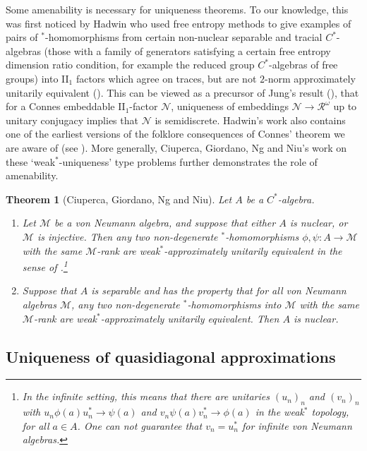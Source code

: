 \documentclass[reqno]{amsart}
\newtheorem*{theorem*}{Theorem}
\theoremstyle{definition}
\theoremstyle{remark}
\numberwithin{equation}{section}
\theoremstyle{definition}
\begin{document}
Some amenability is necessary for uniqueness theorems.  To our knowledge, this was first noticed by Hadwin who used free entropy methods to give examples of pairs of $^*$-homomorphisms from certain non-nuclear separable and tracial $C^*$-algebras (those with a family of generators satisfying a certain free entropy dimension ratio condition, for example the reduced group $C^*$-algebras of free groups) into II$_1$ factors which agree on traces, but are not $2$-norm approximately unitarily equivalent (\cite[Corollary 3.5]{Hadwin:FreeEntropy}). This can be viewed as a precursor of Jung's result (\cite{Jung:MA}), that for a Connes embeddable II$_1$-factor $\mathcal N$, uniqueness of embeddings $\mathcal N\to\mathcal R^\omega$ up to unitary conjugacy implies that $\mathcal N$ is semidiscrete. Hadwin's work also contains one of the earliest versions of the folklore consequences of Connes' theorem we are aware of (see \cite[Theorem 2.1]{Hadwin:FreeEntropy}). More generally, Ciuperca, Giordano, Ng and Niu's work on these `weak$^*$-uniqueness' type problems further demonstrates the role of amenability.

\begin{theorem*}[Ciuperca, Giordano, Ng and Niu] Let $A$ be a $C^*$-algebra.
\begin{enumerate}
    \item
    Let $\mathcal M$ be a von Neumann algebra, and suppose that either $A$ is nuclear, or $\mathcal M$ is injective. Then any two non-degenerate $^*$-homomorphisms $\phi,\psi\colon A\to\mathcal M$ with the same $\mathcal M$-rank are weak$^*$-approximately unitarily equivalent in the sense of \cite[Definition 1.1(c)]{CGNN:Adv}.\footnote{In the infinite setting, this means that there are unitaries $(u_n)_{n}$ and $(v_n)_{n}$ with $u_n\phi(a)u_n^*\to \psi(a)$ and $v_n\psi(a)v_n^*\to \phi(a)$ in the weak$^*$ topology, for all $a\in A$. One can not guarantee that $v_n=u_n^*$ for infinite von Neumann algebras.} 
    \item Suppose that $A$ is separable and has the property that for all von Neumann algebras $\mathcal M$, any two non-degenerate $^*$-homomorphisms into $\mathcal M$ with the same $\mathcal M$-rank are weak$^*$-approximately unitarily equivalent.  Then $A$ is nuclear.
    \end{enumerate}
\end{theorem*}

\subsection*{Uniqueness of quasidiagonal approximations}
\end{document}
